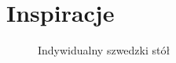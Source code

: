 \documentclass[a4paper,10pt]{book}
\begin{document}
 \chapter{Inspiracje}

 \begin{figure}[H]
    \centering
    \begin{minipage}{0.4\textwidth}
        \centering
        \caption{Indywidualny szwedzki stół}
    \end{minipage}
    \hspace{0.05\textwidth}
    \begin{minipage}{0.4\textwidth}
        \centering

\end{minipage}
\end{figure}
\end{document}
